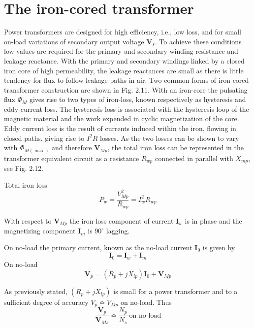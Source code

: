 \documentclass[a4paper,numbers=noenddot,12pt]{scrbook}
\begin{document}
\section{The iron-cored transformer} 
Power transformers are designed for high efficiency, i.e., low loss, and for small on-load variations of secondary output voltage $\mathbf{V}_s$. To achieve these conditions low values are required for the primary and secondary winding resistance and leakage reactance. With the primary and secondary windings linked by a closed iron core of high permeability, the leakage reactances are small as there is little tendency for flux to follow leakage paths in air. Two common forms of iron-cored transformer construction are shown in Fig. 2.11. 
With an iron-core the pulsating flux $\Phi_M$ gives rise to two types of iron-loss, known respectively as hysteresis and eddy-current loss. The hysteresis loss is associated with the hysteresis loop of the magnetic material and the work expended in cyclic magnetization of the core. Eddy current loss is the result of currents induced within the iron, flowing in closed paths, giving rise to $I^2 R$ losses. As the two losses can be shown to vary with $\Phi_{M(\max)}$ and therefore
$\mathbf{V}_{Mp}$, the total iron loss can be represented in the transformer equivalent circuit as a resistance $R_{wp}$ connected in parallel with $X_{mp}$, see Fig. 2.12.

Total iron loss
\begin{equation}
    P_w = \dfrac{V^2_{Mp}}{R_{wp}} = I_w^2 R_{wp}
    \label{eq:Eq2.64}
\end{equation}

With respect to $\mathbf{V}_{Mp}$ the iron loss component of current $\mathbf{I}_w$ is in phase and the magnetizing component $\mathbf{I}_m$ is $90^\circ$ lagging.

On no-load the primary current, known as the no-load current $\mathbf{I}_0$ is given by
\begin{equation}
    \mathbf{I}_0 = \mathbf{I}_w + \mathbf{I}_m
    \label{eq:Eq2.65}
\end{equation}
On no-load
\begin{equation}
    \mathbf{V}_p = (R_p + jX_{lp}) \mathbf{I}_0 + \mathbf{V}_{Mp}
    \label{eq:Eq2.66}
\end{equation}

As previously stated, $(R_p + jX_{lp})$ is small for a power transformer and to a sufficient degree of accuracy $V_p \bumpeq V_{Mp}$ on no-load. Thus
\begin{equation}
    \dfrac{\mathbf{V}_p}{\mathbf{V}_{Ms}} \bumpeq \dfrac{N_p}{N_s} \ \text{on no-load}
    \label{eq:Eq2.67}
\end{equation}
\end{document}
